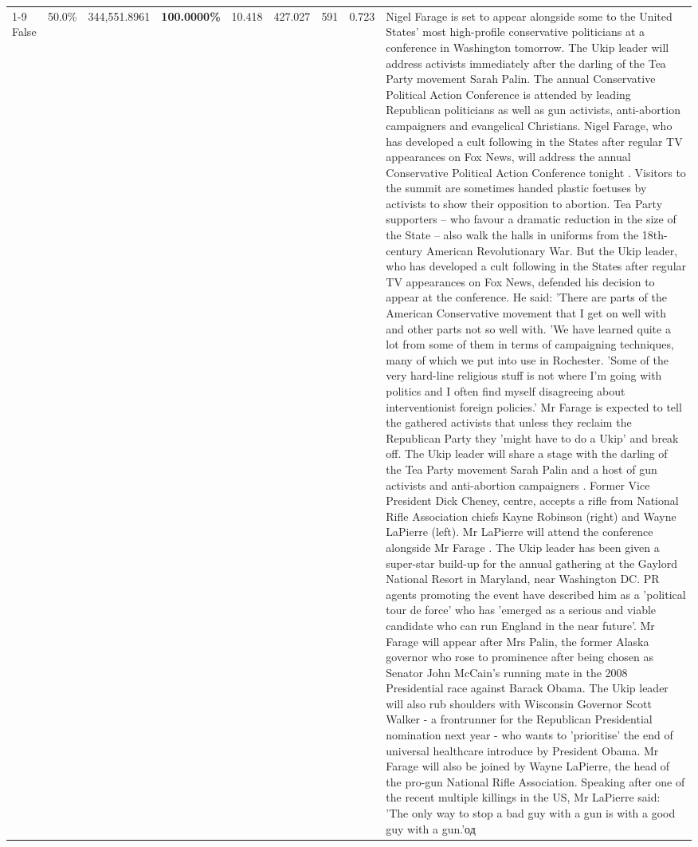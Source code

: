 \begin{table}[H]
\begin{tabular}{lllrlllll}
\cline{1-9}
False & 50.0\% & 344,551.8961 & \bfseries \color{red} 100.0000\% & 10.418 & 427.027 & 591 & 0.723 & Nigel Farage is set to appear alongside some to the United States' most high-profile conservative politicians at a conference in Washington tomorrow. The Ukip leader will address activists immediately after the darling of the Tea Party movement Sarah Palin. The annual Conservative Political Action Conference is attended by leading Republican politicians as well as gun activists, anti-abortion campaigners and evangelical Christians. Nigel Farage, who has developed a cult following in the States after regular TV appearances on Fox News, will address the annual Conservative Political Action Conference tonight . Visitors to the summit are sometimes handed plastic foetuses by activists to show their opposition to abortion. Tea Party supporters – who favour a dramatic reduction in the size of the State – also walk the halls in uniforms from the 18th-century American Revolutionary War. But the Ukip leader, who has developed a cult following in the States after regular TV appearances on Fox News, defended his decision to appear at the conference. He said: 'There are parts of the American Conservative movement that I get on well with and other parts not so well with. 'We have learned quite a lot from some of them in terms of campaigning techniques, many of which we put into use in Rochester. 'Some of the very hard-line religious stuff is not where I'm going with politics and I often find myself disagreeing about interventionist foreign policies.' Mr Farage is expected to tell the gathered activists that unless they reclaim the Republican Party they 'might have to do a Ukip' and break off. The Ukip leader will share a stage with the darling of the Tea Party movement Sarah Palin and a host of gun activists and anti-abortion campaigners . Former Vice President Dick Cheney, centre, accepts a rifle from National Rifle Association chiefs Kayne Robinson (right) and Wayne LaPierre (left). Mr LaPierre will attend the conference alongside Mr Farage . The Ukip leader has been given a super-star build-up for the annual gathering at the Gaylord National Resort in Maryland, near Washington DC. PR agents promoting the event have described him as a 'political tour de force' who has 'emerged as a serious and viable candidate who can run England in the near future'. Mr Farage will appear after Mrs Palin, the former Alaska governor who rose to prominence after being chosen as Senator John McCain's running mate in the 2008 Presidential race against Barack Obama. The Ukip leader will also rub shoulders with Wisconsin Governor Scott Walker - a frontrunner for the Republican Presidential nomination next year - who wants to 'prioritise' the end of universal healthcare introduce by President Obama. Mr Farage will also be joined by Wayne LaPierre, the head of the pro-gun National Rifle Association. Speaking after one of the recent multiple killings in the US, Mr LaPierre said: 'The only way to stop a bad guy with a gun is with a good guy with a gun.'од \\

\end{tabular}
\end{table}

